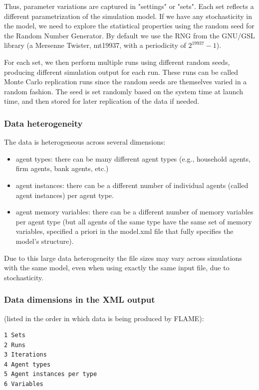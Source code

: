\documentclass[10pt,a4paper]{article}
\begin{document}
Thus, parameter variations are captured in "settings" or "sets". Each set reflects a different parametrization of the simulation model.
If we have any stochasticity in the model, we need to explore the statistical properties using the random seed for the Random Number Generator.
By default we use the RNG from the GNU/GSL library (a Mersenne Twister, mt19937, with a periodicity of $2^{19937} - 1$).

For each set, we then perform multiple runs using different random seeds, producing different simulation output for each run.
These runs can be called Monte Carlo replication runs since the random seeds are themselves varied in a random fashion.
The seed is set randomly based on the system time at launch time, and then stored for later replication of the data if needed.


\subsubsection{Data heterogeneity}
The data is heterogeneous across several dimensions:

\begin{itemize}
\item agent types: there can be many different agent types (e.g., household agents, firm agents, bank agents, etc.)

\item agent instances: there can be a different number of individual agents (called agent instances) per agent type.

\item agent memory variables: there can be a different number of memory variables per agent type (but all agents of the same type have the same set of memory variables, specified a priori in the model.xml file that fully specifies the model's structure).
\end{itemize}

Due to this large data heterogeneity the file sizes may vary across simulations with the same model, even when using exactly the same input file, due to stochasticity.


\subsubsection{Data dimensions in the XML output}
(listed in the order in which data is being produced by FLAME):

\begin{verbatim}
1 Sets
2 Runs
3 Iterations
4 Agent types
5 Agent instances per type
6 Variables
\end{verbatim}
\end{document}
